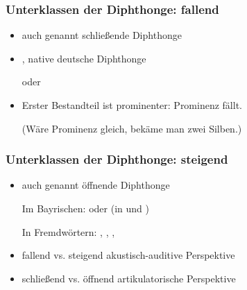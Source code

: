 \begin{frame}
\frametitle{Unterklassen der Diphthonge: fallend}
		
		\begin{itemize}
			
			\item auch genannt schließende Diphthonge 
			\item {}, native deutsche Diphthonge

			\ea {} oder 
			\z

			\item Erster Bestandteil ist prominenter: Prominenz fällt.\par
				(Wäre Prominenz gleich, bekäme man zwei Silben.)
				
			\end{itemize}
	
\end{frame}
\begin{frame}
\frametitle{Unterklassen der Diphthonge: steigend}		

		\begin{itemize}	
			\item auch genannt öffnende Diphthonge

			\ea Im Bayrischen: \textipa{[ \t{ɪa} , \t{ʊa} ]} oder  (in  und )
			\z
			
			\ea In Fremdwörtern: , , , 
			\z
			
			\item fallend vs. steigend \ras akustisch-auditive Perspektive
			\item schließend vs. öffnend \ras artikulatorische Perspektive
		\end{itemize}
		
\end{frame}


